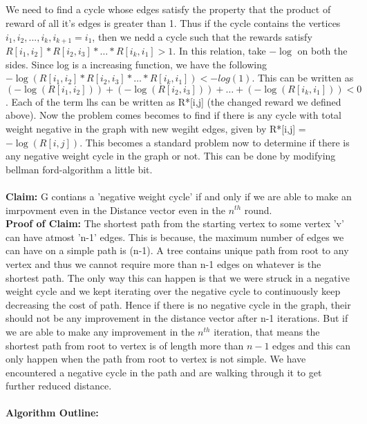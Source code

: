 \documentclass{article}
\begin{document}
\subsection{} 

We need to find a cycle whose edges satisfy the property that the product of reward of all it's edges is greater than 1. Thus if the cycle contains the vertices $i_1, i_2, ..., i_k, i_{k+1} = i_1 $, then we nedd a cycle such that the rewards satisfy $R[i_1, i_2]*R[i_2, i_3]* \dots * R[i_k, i_1] > 1$. In this relation, take $-\log$ on both the sides. Since log is a increasing function, we have the following $-\log{(R[i_1, i_2]*R[i_2, i_3]* \dots * R[i_k, i_1])} < -log{(1)}$. This can be written as $(-\log{(R[i_1, i_2])}) + (-\log{(R[i_2, i_3])}) + \dots + (-\log{(R[i_k, i_1])}) < 0$. Each of the term lhs can be written as R*[i,j] (the changed reward we defined above). Now the problem comes becomes to find if there is any cycle with total weight negative in the graph with new wegiht edges, given by R*[i,j] = $-\log{(R[i,j])}$. This becomes a standard problem now to determine if there is any negative weight cycle in the graph or not. This can be done by modifying bellman ford-algorithm a little bit. 
\\\\
\textbf{Claim:} G contians a 'negative weight cycle' if and only if we are able to make an imrpovment even in the Distance vector even in the $n^{th}$ round.\\
\textbf{Proof of Claim:} The shortest path from the starting vertex to some vertex 'v' can have atmost 'n-1' edges. This is because, the maximum number of edges we can have on a simple path is (n-1). A tree contains unique path from root to any vertex and thus we cannot require more than n-1 edges on whatever is the shortest path. The only way this can happen is that we were struck in a negative weight cycle and we kept iterating over the negative cycle to continuously keep decreasing the cost of path. Hence if there is no negative cycle in the graph, their should not be any improvement in the distance vector after n-1 iterations. But if we are able to make any improvement in the $n^{th}$ iteration, that means the shortest path from root to vertex is of length more than $n-1$ edges and this can only happen when the path from root to vertex is not simple. We have encountered a negative cycle in the path and are walking through it to get further reduced distance.
\\\\
\textbf{Algorithm Outline:}\\
\end{document}
